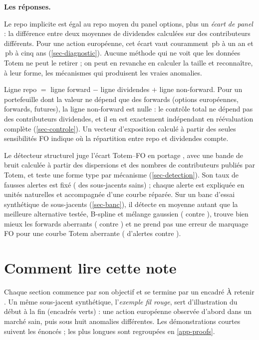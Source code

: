 \begin{bref}
\medskip
\textbf{Les réponses.}
\begin{description}[leftmargin=1.1cm,labelwidth=0.9cm,labelsep=0.2cm,itemsep=2pt]
\item[R1] Le repo implicite est égal au repo moyen du panel options, plus un \emph{écart de panel} : la différence
entre deux moyennes de dividendes calculées sur des contributeurs différents. Pour une action européenne,
cet écart vaut couramment \vGapOneY\,pb à un an et \vGapFiveY\,pb à cinq ans (\cref{sec-diagnostic}). Aucune méthode qui ne voit
que les données Totem ne peut le retirer ; on peut en revanche en calculer la taille et reconnaître, à leur forme,
les mécanismes qui produisent les vraies anomalies.
\item[R2] Ligne repo $=$ ligne forward $-$ ligne dividendes $+$ ligne non-forward. Pour un portefeuille dont la
valeur ne dépend que des forwards (options européennes, forwards, futures), la ligne non-forward est nulle : le
contrôle total ne dépend pas des contributeurs dividendes, et il en est exactement indépendant en réévaluation
complète (\cref{sec-controle}). Un vecteur d'exposition calculé à partir des seules sensibilités FO indique où la
répartition entre repo et dividendes compte.
\item[R3] Le détecteur structurel juge l'écart Totem--FO \og en portage \fg{}, avec une bande de bruit calculée à
partir des dispersions et des nombres de contributeurs publiés par Totem, et teste une forme type par mécanisme
(\cref{sec-detection}). Son taux de fausses alertes est fixé (\vFPR{} des sous-jacents sains) ; chaque alerte est
expliquée en unités naturelles et accompagnée d'une courbe réparée. Sur un banc d'essai synthétique de \vNTest{}
sous-jacents (\cref{sec-banc}), il détecte en moyenne autant que la meilleure alternative testée, B-spline et mélange
gaussien (\vMeanStruct{} contre \vMeanGmmDiff{}), trouve bien mieux les forwards aberrants (\vFwdStruct{} contre
\vFwdGmmDiff{}) et ne prend pas une erreur de marquage FO pour une courbe Totem aberrante (\vFoStruct{} d'alertes
contre \vFoGmmDiff{}).
\end{description}
\end{bref}

\newpage
\section*{Comment lire cette note}
Chaque section commence par son objectif et se termine par un encadré \og À retenir \fg{}. Un même sous-jacent
synthétique, l'\emph{exemple fil rouge}, sert d'illustration du début à la fin (encadrés verts) : une action européenne
observée d'abord dans un marché sain, puis sous huit anomalies différentes. Les démonstrations courtes suivent les
énoncés ; les plus longues sont regroupées en \cref{app-proofs}.


